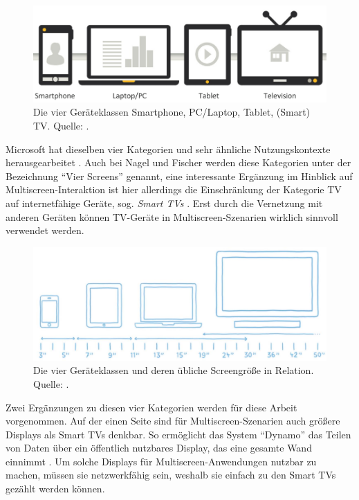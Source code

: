 \begin{figure}
\centering
\includegraphics[width=\textwidth]{bilder/4_devices.png}
\caption{Die vier Geräteklassen Smartphone, PC/Laptop, Tablet, (Smart) TV. Quelle: \citep{Google2012}.}
\end{figure}
Microsoft hat dieselben vier Kategorien und sehr ähnliche Nutzungskontexte herausgearbeitet \citep{Microsoft2013}. Auch bei Nagel und Fischer werden diese Kategorien unter der Bezeichnung "`Vier Screens"' genannt, eine interessante Ergänzung im Hinblick auf Multiscreen-Interaktion ist hier allerdings die Einschränkung der Kategorie TV auf internetfähige Geräte, sog. \textit{Smart TVs} \citep[31]{Nagel2013}. Erst durch die Vernetzung mit anderen Geräten können TV-Geräte in Multiscreen-Szenarien wirklich sinnvoll verwendet werden. 

\begin{figure}
\centering
\includegraphics[width=\textwidth]{bilder/devices.png}
\caption{Die vier Geräteklassen und deren übliche Screengröße in Relation. Quelle: \citep{Nagel2013}.}
\end{figure}

Zwei Ergänzungen zu diesen vier Kategorien werden für diese Arbeit vorgenommen. Auf der einen Seite sind für Multiscreen-Szenarien auch größere Displays als Smart TVs denkbar. So ermöglicht \zb das System "`Dynamo"' das Teilen von Daten über ein öffentlich nutzbares Display, das eine gesamte Wand einnimmt \citep{Izadi2003}. Um solche Displays für Multiscreen-Anwendungen nutzbar zu machen, müssen sie netzwerkfähig sein, weshalb sie einfach zu den Smart TVs gezählt werden können.

